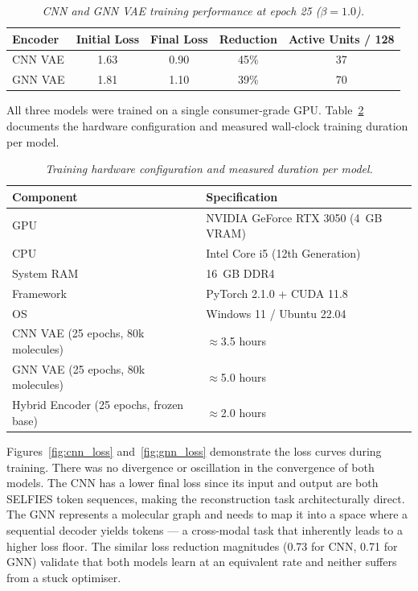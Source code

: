\documentclass[12pt,a4paper]{report}
\begin{document}
\begin{table}[htbp]
\centering
\caption{\textit{CNN and GNN VAE training performance at epoch 25 ($\beta = 1.0$).}}
\label{tab:training_performance}
\begin{tabular}{lcccc}
\hline
\textbf{Encoder} & \textbf{Initial Loss} & \textbf{Final Loss} & \textbf{Reduction} & \textbf{Active Units / 128} \\
\hline
CNN VAE & 1.63 & 0.90 & 45\% & 37 \\
GNN VAE & 1.81 & 1.10 & 39\% & 70 \\
\hline
\end{tabular}
\end{table}

All three models were trained on a single consumer-grade GPU. Table~\ref{tab:hardware} documents the hardware configuration and measured wall-clock training duration per model.

\begin{table}[htbp]
\centering
\caption{\textit{Training hardware configuration and measured duration per model.}}
\label{tab:hardware}
\begin{tabular}{ll}
\hline
\textbf{Component} & \textbf{Specification} \\
\hline
GPU & NVIDIA GeForce RTX 3050 (4~GB VRAM) \\
CPU & Intel Core i5 (12th Generation) \\
System RAM & 16~GB DDR4 \\
Framework & PyTorch 2.1.0 + CUDA 11.8 \\
OS & Windows 11 / Ubuntu 22.04 \\
\hline
CNN VAE (25 epochs, 80k molecules) & $\approx$3.5 hours \\
GNN VAE (25 epochs, 80k molecules) & $\approx$5.0 hours \\
Hybrid Encoder (25 epochs, frozen base) & $\approx$2.0 hours \\
\hline
\end{tabular}
\end{table}

Figures~\ref{fig:cnn_loss} and~\ref{fig:gnn_loss} demonstrate the loss curves during training. There was no divergence or oscillation in the convergence of both models. The CNN has a lower final loss since its input and output are both SELFIES token sequences, making the reconstruction task architecturally direct. The GNN represents a molecular graph and needs to map it into a space where a sequential decoder yields tokens — a cross-modal task that inherently leads to a higher loss floor. The similar loss reduction magnitudes (0.73 for CNN, 0.71 for GNN) validate that both models learn at an equivalent rate and neither suffers from a stuck optimiser.
\end{document}
